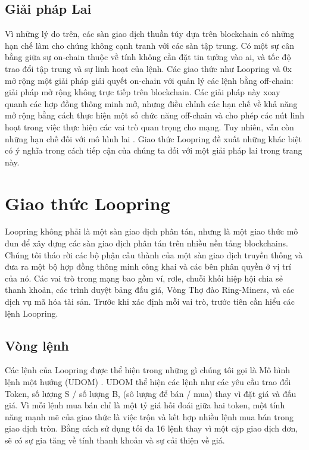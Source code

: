 \documentclass[12pt,a4paper]{article}
\begin{document}
\begin{multicols}{2}
\subsection{Giải pháp Lai}
Vì những lý do trên, các sàn giao dịch thuần túy dựa trên blockchain có những hạn chế làm cho chúng không cạnh tranh với các sàn tập trung. Có một sự cân bằng giữa sự on-chain thuộc về tính không cần đặt tin tưởng vào ai, và tốc độ trao đổi tập trung và sự linh hoạt của lệnh. Các giao thức như Loopring và 0x \cite{warren20170x} mở rộng một giải pháp giải quyết on-chain với quản lý các lệnh bằng off-chain: giải pháp mở rộng không trực tiếp trên blockchain. Các giải pháp này xoay quanh các hợp đồng thông minh mở, nhưng điều chỉnh các hạn chế về khả năng mở rộng bằng cách thực hiện một số chức năng off-chain và cho phép các nút linh hoạt trong việc thực hiện các vai trò quan trọng cho mạng. Tuy nhiên, vẫn còn những hạn chế đối với mô hình lai \cite{unenumerated2006}. Giao thức Loopring đề xuất những khác biệt có ý nghĩa trong cách tiếp cận của chúng ta đối với một giải pháp lai trong trang này.

\section{Giao thức Loopring \label{sec:loopring_protocol}}
Loopring không phải là một sàn giao dịch phân tán, nhưng là một giao thức mô đun để xây dựng các sàn giao dịch phân tán trên nhiều nền tảng blockchains. Chúng tôi tháo rời các bộ phận cấu thành của một sàn giao dịch truyền thống và đưa ra một bộ hợp đồng thông minh công khai và các bên phân quyền ở vị trí của nó. Các vai trò trong mạng bao gồm ví, rơle, chuỗi khối hiệp hội chia sẻ thanh khoản, các trình duyệt bảng đấu giá, Vòng Thợ đào Ring-Miners, và các dịch vụ mã hóa tài sản. Trước khi xác định mỗi vai trò, trước tiên cần hiểu các lệnh Loopring.

\subsection{Vòng lệnh\label{sec:order_ring}}
Các lệnh của Loopring được thể hiện trong những gì chúng tôi gọi là Mô hình lệnh một hướng (UDOM) \cite{mcmillan2014inside}. UDOM thể hiện các lệnh như các yêu cầu trao đổi Token, số lượng S / số lượng B, (sô lượng để bán / mua) thay vì đặt giá và đấu giá. Vì mỗi lệnh mua bán chỉ là một tỷ giá hối đoái giữa hai token, một tính năng mạnh mẽ của giao thức là việc trộn và kết hợp nhiều lệnh mua bán trong giao dịch tròn. Bằng cách sử dụng tối đa 16 lệnh thay vì một cặp giao dịch đơn, sẽ có sự gia tăng về tính thanh khoản và sự cải thiện về giá.


\end{multicols}
\end{document}
